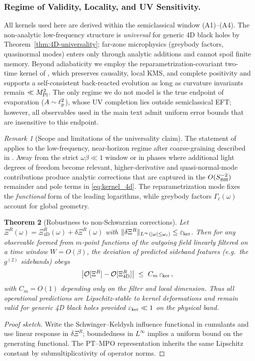 \documentclass[aps,prd,preprint,onecolumn,superscriptaddress,nofootinbib,longbibliography,floatfix,11pt,showpacs,showkeys]{revtex4-2}
\newcommand{\gII}{g^{(2)}}
\theoremstyle{plain}
\newtheorem{theorem}{Theorem}
\theoremstyle{definition}
\theoremstyle{remark}
\newtheorem{remark}[theorem]{Remark}
\begin{document}
\subsubsection{Regime of Validity, Locality, and UV Sensitivity.}
All kernels used here are derived within the semiclassical window (A1)--(A4). The non-analytic low-frequency structure is \emph{universal} for generic 4D black holes by Theorem~\ref{thm:4D-universality}; far-zone microphysics (greybody factors, quasinormal modes) enters only through analytic additions and cannot spoil finite memory. Beyond adiabaticity we employ the reparametrization-covariant two-time kernel of , which preserves causality, local KMS, and complete positivity and supports a self-consistent back-reacted evolution as long as curvature invariants remain $\ll M_{\rm Pl}^2$. The only regime we do not model is the true endpoint of evaporation ($A\sim \ell_{\rm p}^2$), whose UV completion lies outside semiclassical EFT; however, all observables used in the main text admit uniform error bounds that are insensitive to this endpoint.


\begin{remark}[Scope and limitations of the universality claim]\label{rem:universality-scope}
The statement of  applies to the low-frequency, near-horizon regime after coarse-graining described in .
Away from the strict $\omega\beta\ll 1$ window or in phases where additional light degrees of freedom become relevant,
higher-derivative and quasi-normal-mode contributions produce analytic corrections that are captured in the $O(S_{\rm BH}^{-2})$ remainder and pole terms in \eqref{eq:kernel_4d}.
The reparametrization mode fixes the \emph{functional} form of the leading logarithms, while greybody factors $\Gamma_\ell(\omega)$ account for global geometry.
\end{remark}

\begin{theorem}[Robustness to non-Schwarzian corrections]\label{thm:4D-robustness}
Let $\Xi^R(\omega)=\Xi^R_{4\mathrm{D}}(\omega)+\delta\Xi^R(\omega)$ with $\|\delta\Xi^R\|_{L^\infty(|\omega|\le\omega_c)}\le \varepsilon_{\rm ker}$.
Then for any observable formed from $m$-point functions of the outgoing field linearly filtered on a time window $W=O(\beta)$,
the deviation of predicted sideband features (e.g.\ the $\gII$ sidebands) obeys
\[
\big|\mathcal{O}[\Xi^R]-\mathcal{O}[\Xi^R_{4\mathrm{D}}]\big|\ \le\ C_m\,\varepsilon_{\rm ker}\,,
\]
with $C_m=O(1)$ depending only on the filter and local dimension. Thus all operational predictions are Lipschitz-stable to kernel deformations
and remain valid for generic 4D black holes provided $\varepsilon_{\rm ker}\ll 1$ on the physical band.
\end{theorem}
\begin{proof}[Proof sketch]
Write the Schwinger--Keldysh influence functional in cumulants and use linear response in $\delta\Xi^R$; boundedness in $L^\infty$ implies a uniform bound on the generating functional.
The PT--MPO representation inherits the same Lipschitz constant by submultiplicativity of operator norms.
\end{proof}
\end{document}
